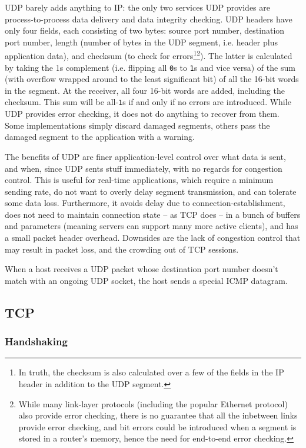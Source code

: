\documentclass[8pt, table, xcdraw]{article}%
\begin{document}
UDP barely adds anything to IP: the only two services UDP provides are process-to-process data delivery and data integrity checking. UDP headers have only four fields, each consisting of two bytes: source port number, destination port number, length (number of bytes in the UDP segment, i.e. header plus application data), and checksum (to check for errors\footnote{In truth, the checksum is also calculated over a few of the fields in the IP header in addition to the UDP segment.}\footnote{While many link-layer protocols (including the popular Ethernet protocol) also provide error checking, there is no guarantee that all the inbetween links provide error checking, and bit errors could be introduced when a segment is stored in a router’s memory, hence the need for end-to-end error checking.}). The latter is calculated by taking the 1s complement (i.e. flipping all \texttt{0}s to \texttt{1}s and vice versa) of the sum (with overflow wrapped around to the least significant bit) of all the 16-bit words in the segment. At the receiver, all four 16-bit words are added, including the checksum. This sum will be all-\texttt{1}s if and only if no errors are introduced. While UDP provides error checking, it does not do anything to recover from them. Some implementations simply discard damaged segments, others pass the damaged segment to the application with a warning.

The benefits of UDP are finer application-level control over what data is sent, and when, since UDP sents stuff immediately, with no regards for congestion control. This is useful for real-time applications, which require a minimum sending rate, do not want to overly delay segment transmission, and can tolerate some data loss. Furthermore, it avoids delay due to connection-establishment, does not need to maintain connection state -- as TCP does -- in a bunch of buffers and parameters (meaning servers can support many more active clients), and has a small packet header overhead. Downsides are the lack of congestion control that may result in packet loss, and the crowding out of TCP sessions.

When a host receives a UDP packet whose destination port number doesn’t match with an ongoing UDP socket, the host sends a special ICMP datagram.

\subsection{TCP} \label{ch:transport:tcp}

\subsubsection{Handshaking}
\end{document}
